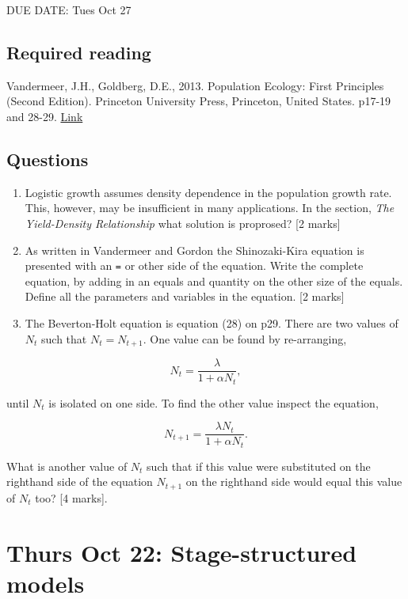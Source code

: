\documentclass[]{book}
\begin{document}
DUE DATE: Tues Oct 27

\section{Required reading}\label{required-reading-4}

Vandermeer, J.H., Goldberg, D.E., 2013. Population Ecology: First
Principles (Second Edition). Princeton University Press, Princeton,
United States. p17-19 and 28-29.
\href{https://ebookcentral-proquest-com.qe2a-proxy.mun.ca/lib/mun/detail.action?docID=1205619}{Link}

\section{Questions}\label{questions-12}

\begin{enumerate}
\def\labelenumi{\arabic{enumi}.}
\item
  Logistic growth assumes density dependence in the population growth
  rate. This, however, may be insufficient in many applications. In the
  section, \emph{The Yield-Density Relationship} what solution is
  proprosed? {[}2 marks{]}
\item
  As written in Vandermeer and Gordon the Shinozaki-Kira equation is
  presented with an \texttt{=} or other side of the equation. Write the
  complete equation, by adding in an equals and quantity on the other
  size of the equals. Define all the parameters and variables in the
  equation. {[}2 marks{]}
\item
  The Beverton-Holt equation is equation (28) on p29. There are two
  values of \(N_t\) such that \(N_t = N_{t+1}\). One value can be found
  by re-arranging,
\end{enumerate}

\[
N_t = \frac{\lambda}{1+\alpha N_t},
\]

until \(N_t\) is isolated on one side. To find the other value inspect
the equation,

\[
N_{t+1} = \frac{\lambda N_t}{1+\alpha N_t}.
\]

What is another value of \(N_t\) such that if this value were
substituted on the righthand side of the equation \(N_{t+1}\) on the
righthand side would equal this value of \(N_t\) too? {[}4 marks{]}.

\chapter{Thurs Oct 22: Stage-structured
models}\label{thurs-oct-22-stage-structured-models}
\end{document}
